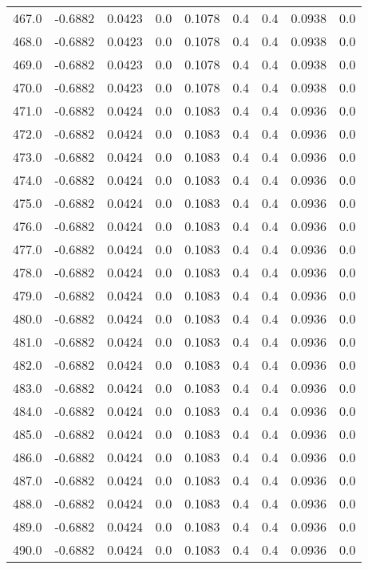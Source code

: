 \begin{longtable}{lrrrrrrrr}
467.0 & -0.6882 & 0.0423 & 0.0 & 0.1078 & 0.4 & 0.4 & 0.0938 & 0.0 \\
468.0 & -0.6882 & 0.0423 & 0.0 & 0.1078 & 0.4 & 0.4 & 0.0938 & 0.0 \\
469.0 & -0.6882 & 0.0423 & 0.0 & 0.1078 & 0.4 & 0.4 & 0.0938 & 0.0 \\
470.0 & -0.6882 & 0.0423 & 0.0 & 0.1078 & 0.4 & 0.4 & 0.0938 & 0.0 \\
471.0 & -0.6882 & 0.0424 & 0.0 & 0.1083 & 0.4 & 0.4 & 0.0936 & 0.0 \\
472.0 & -0.6882 & 0.0424 & 0.0 & 0.1083 & 0.4 & 0.4 & 0.0936 & 0.0 \\
473.0 & -0.6882 & 0.0424 & 0.0 & 0.1083 & 0.4 & 0.4 & 0.0936 & 0.0 \\
474.0 & -0.6882 & 0.0424 & 0.0 & 0.1083 & 0.4 & 0.4 & 0.0936 & 0.0 \\
475.0 & -0.6882 & 0.0424 & 0.0 & 0.1083 & 0.4 & 0.4 & 0.0936 & 0.0 \\
476.0 & -0.6882 & 0.0424 & 0.0 & 0.1083 & 0.4 & 0.4 & 0.0936 & 0.0 \\
477.0 & -0.6882 & 0.0424 & 0.0 & 0.1083 & 0.4 & 0.4 & 0.0936 & 0.0 \\
478.0 & -0.6882 & 0.0424 & 0.0 & 0.1083 & 0.4 & 0.4 & 0.0936 & 0.0 \\
479.0 & -0.6882 & 0.0424 & 0.0 & 0.1083 & 0.4 & 0.4 & 0.0936 & 0.0 \\
480.0 & -0.6882 & 0.0424 & 0.0 & 0.1083 & 0.4 & 0.4 & 0.0936 & 0.0 \\
481.0 & -0.6882 & 0.0424 & 0.0 & 0.1083 & 0.4 & 0.4 & 0.0936 & 0.0 \\
482.0 & -0.6882 & 0.0424 & 0.0 & 0.1083 & 0.4 & 0.4 & 0.0936 & 0.0 \\
483.0 & -0.6882 & 0.0424 & 0.0 & 0.1083 & 0.4 & 0.4 & 0.0936 & 0.0 \\
484.0 & -0.6882 & 0.0424 & 0.0 & 0.1083 & 0.4 & 0.4 & 0.0936 & 0.0 \\
485.0 & -0.6882 & 0.0424 & 0.0 & 0.1083 & 0.4 & 0.4 & 0.0936 & 0.0 \\
486.0 & -0.6882 & 0.0424 & 0.0 & 0.1083 & 0.4 & 0.4 & 0.0936 & 0.0 \\
487.0 & -0.6882 & 0.0424 & 0.0 & 0.1083 & 0.4 & 0.4 & 0.0936 & 0.0 \\
488.0 & -0.6882 & 0.0424 & 0.0 & 0.1083 & 0.4 & 0.4 & 0.0936 & 0.0 \\
489.0 & -0.6882 & 0.0424 & 0.0 & 0.1083 & 0.4 & 0.4 & 0.0936 & 0.0 \\
490.0 & -0.6882 & 0.0424 & 0.0 & 0.1083 & 0.4 & 0.4 & 0.0936 & 0.0 \\

\end{longtable}

